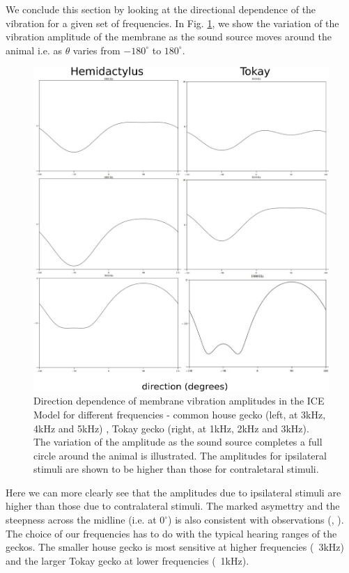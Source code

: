 We conclude this section by looking at the directional dependence of the vibration for a given set of frequencies. In Fig. \ref{directionplots}, we show the variation of the vibration amplitude of the membrane as
the sound source moves around the animal i.e. as $\theta$ varies from $-180^\circ$ to $180^\circ$.
\begin{figure}[ht!]
\centering
  \includegraphics[width=.5\linewidth]{Diagrams/Plots/directionplots/directionplots.png}
  \caption[Direction dependence of membrane vibration amplitudes for different frequencies.]{Direction dependence of membrane vibration amplitudes  in the ICE Model for different frequencies - common house gecko (left, at 3kHz, 4kHz and 5kHz)
  , Tokay gecko (right, at 1kHz, 2kHz and 3kHz).
  The variation of the amplitude as the sound source completes a full circle around the animal is illustrated. The amplitudes for ipsilateral stimuli are shown to be
  higher than those for contraletaral stimuli.}
  \label{directionplots}
\end{figure}
Here we can more clearly see that the amplitudes due to ipsilateral stimuli are higher than those due to contralateral stimuli. The marked asymettry and the steepness across the midline (i.e. at $0^\circ$)
is also consistent with observations (\cite{dalsgaardmanley1}, \cite{dalsgaardmanley2}). The choice of our frequencies has to do with the typical hearing ranges of the geckos. The smaller house
gecko is most sensitive at higher frequencies (~3kHz) and the larger Tokay gecko at lower frequencies (~1kHz).

